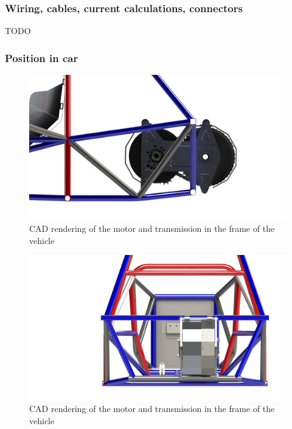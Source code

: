 \documentclass{article}
\begin{document}
\subsubsection{Wiring, cables, current calculations, connectors}
TODO

\subsubsection{Position in car}

\begin{figure}[H]
    \centering
    \includegraphics[width = 0.8 \textwidth]{motor_side}
    \caption{CAD rendering of the motor and transmission in the frame of the vehicle}
    \label{motor_side}
\end{figure}

\begin{figure}[H]
    \centering
    \includegraphics[width = 0.8 \textwidth]{motor_rear}
    \caption{CAD rendering of the motor and transmission in the frame of the vehicle}
    \label{motor_rear}
\end{figure}
\end{document}
